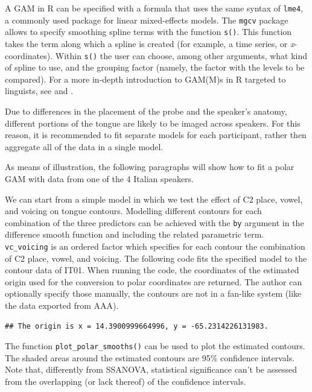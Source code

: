 \documentclass[12pt,]{article}
\begin{document}
A GAM in R can be specified with a formula that uses the same syntax of
\texttt{lme4}, a commonly used package for linear mixed-effects models.
The \texttt{mgcv} package allows to specify smoothing spline terms with
the function \texttt{s()}. This function takes the term along which a
spline is created (for example, a time series, or \emph{x}-coordinates).
Within \texttt{s()} the user can choose, among other arguments, what
kind of spline to use, and the grouping factor (namely, the factor with
the levels to be compared). For a more in-depth introduction to GAM(M)s
in R targeted to linguists, see \citet{soskuthy2017} and
\citet{wieling2017}.

Due to differences in the placement of the probe and the speaker's
anatomy, different portions of the tongue are likely to be imaged across
speakers. For this reason, it is recommended to fit separate models for
each participant, rather then aggregate all of the data in a single
model.

As means of illustration, the following paragraphs will show how to fit
a polar GAM with data from one of the 4 Italian speakers.

We can start from a simple model in which we test the effect of C2
place, vowel, and voicing on tongue contours. Modelling different
contours for each combination of the three predictors can be achieved
with the \texttt{by} argument in the difference smooth function and
including the related parametric term. \texttt{vc\_voicing} is an
ordered factor which specifies for each contour the combination of C2
place, vowel, and voicing. The following code fits the specified model
to the contour data of IT01. When running the code, the coordinates of
the estimated origin used for the conversion to polar coordinates are
returned. The author can optionally specify those manually, the contours
are not in a fan-like system (like the data exported from AAA).

\begin{verbatim}
## The origin is x = 14.3900999664996, y = -65.2314226131983.
\end{verbatim}

The function \texttt{plot\_polar\_smooths()} can be used to plot the
estimated contours. The shaded areas around the estimated contours are
95\% confidence intervals. Note that, differently from SSANOVA,
statistical significance can't be assessed from the overlapping (or lack
thereof) of the confidence intervals.
\end{document}
